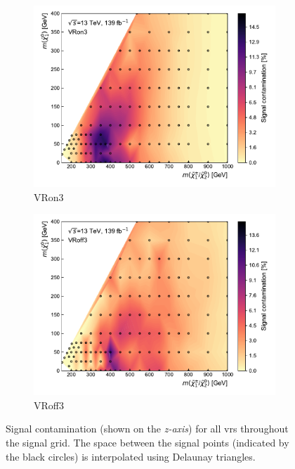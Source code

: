 \begin{figure}
\begin{subfigure}[b]{0.5\linewidth}
		\centering\includegraphics[width=1.0\textwidth]{signal_contamination/plot_VRon3}
		\caption{VRon3\label{fig:signal_contaminations_VRon3}}
	\end{subfigure}\hfill
	\begin{subfigure}[b]{0.5\linewidth}
		\centering\includegraphics[width=1.0\textwidth]{signal_contamination/plot_VRoff3}
		\caption{VRoff3\label{fig:signal_contaminations_VRoff3}}
	\end{subfigure}\hfill

	\caption{Signal contamination (shown on the \textit{z-axis}) for all \glspl{vr} throughout the signal grid. The space between the signal points (indicated by the black circles) is interpolated using Delaunay triangles.}
	\label{fig:results_HF_scans}
\end{figure}
